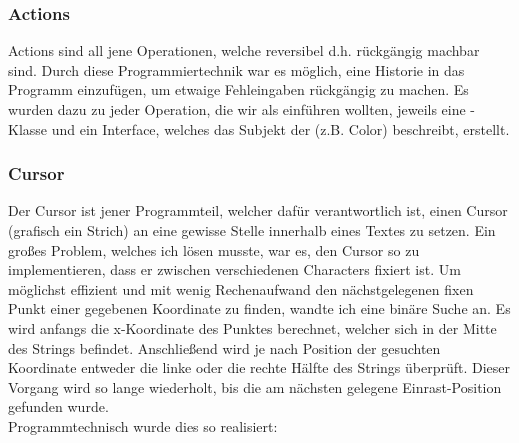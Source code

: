 \subsubsection{Actions}

Actions sind all jene Operationen, welche reversibel d.h. rückgängig machbar sind. Durch diese Programmiertechnik war es möglich, eine Historie in das Programm einzufügen, um etwaige Fehleingaben rückgängig zu machen. Es wurden dazu zu jeder Operation, die wir als  einführen wollten, jeweils eine -Klasse und ein Interface, welches das Subjekt der  (z.B. Color) beschreibt, erstellt.

\subsubsection{Cursor}

Der Cursor ist jener Programmteil, welcher dafür verantwortlich ist, einen Cursor (grafisch ein Strich) an eine gewisse Stelle innerhalb eines Textes zu setzen. Ein großes Problem, welches ich lösen musste, war es, den Cursor so zu implementieren, dass er zwischen verschiedenen Characters fixiert ist. Um möglichst effizient und mit wenig Rechenaufwand den nächstgelegenen fixen Punkt einer gegebenen Koordinate zu finden, wandte ich eine binäre Suche an. Es wird anfangs die x-Koordinate des Punktes berechnet, welcher sich in der Mitte des Strings befindet. Anschließend wird je nach Position der gesuchten Koordinate entweder die linke oder die rechte Hälfte des Strings überprüft. Dieser Vorgang wird so lange wiederholt, bis die am nächsten gelegene Einrast-Position gefunden wurde.\\
Programmtechnisch wurde dies so realisiert:
